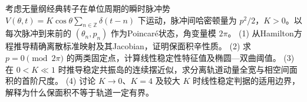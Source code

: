 考虑无量纲经典转子在单位周期的瞬时脉冲势 \(V(\theta,t)=K\cos\theta\sum_{n\in\mathbb Z}\delta(t-n)\) 下运动，脉冲间哈密顿量为 \(p^2/2\)，\(K>0\)。以每次脉冲到来前的 \((\theta_n,p_n)\) 作为Poincaré状态，角变量模 \(2\pi\)。
(1) 从Hamilton方程推导精确离散标准映射及其Jacobian，证明保面积辛性质。
(2) 求 \(p=0\pmod{2\pi}\) 的两类固定点，计算线性稳定性特征值及椭圆—双曲阈值。
(3) 在 \(0<K\ll1\) 时推导稳定共振岛的连续摆近似，求分离轨道动量全宽与相空间面积的首阶尺度。
(4) 讨论 \(K\to0\)、\(K=4\) 及较大 \(K\) 时线性稳定判据的适用边界，解释为什么保面积不等于轨道一定有界。
